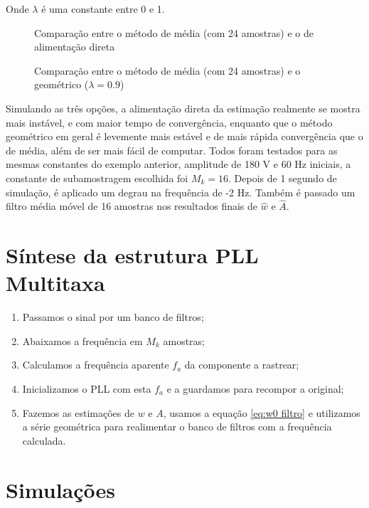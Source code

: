 Onde $\lambda$ é uma constante entre 0 e 1. \\

\begin{figure}[h]
	\centering    
	\def\svgscale{1}
	
	\caption{Comparação entre o método de média (com 24 amostras) e o de alimentação direta}
	\label{fig:esquema_pll}
\end{figure}

\begin{figure}[h]
	\centering    
	\def\svgscale{1}
	
	\caption{Comparação entre o método de média (com 24 amostras) e o geométrico ($\lambda=0.9$)}
	\label{fig:esquema_pll}
\end{figure}

\indent Simulando as três opções, a alimentação direta da estimação realmente se mostra mais instável, e com maior tempo de convergência, enquanto que o método geométrico em geral é levemente mais estável e de mais rápida convergência que o de média, além de ser mais fácil de computar. Todos foram testados para as mesmas constantes do exemplo anterior, amplitude de 180 V e 60 Hz iniciais, a constante de subamostragem escolhida foi $M_k=16$. Depois de 1 segundo de simulação, é aplicado um degrau na frequência de -2 Hz. Também é passado um filtro média móvel de 16 amostras nos resultados finais de $\hat{w}$ e $\hat{A}$.

\section{Síntese da estrutura PLL Multitaxa}

\begin{enumerate}
	\item Passamos o sinal por um banco de filtros;
	\item Abaixamos a frequência em $M_k$ amostras;
	\item Calculamos a frequência aparente $f_a$ da componente a rastrear;
	\item Inicializamos o PLL com esta $f_a$ e a guardamos para recompor a original;
	\item Fazemos as estimações de $w$ e $A$, usamos a equação \ref{eq:w0 filtro} e utilizamos a série geométrica para realimentar o banco de filtros com a frequência calculada.
\end{enumerate}

\section{Simulações}

